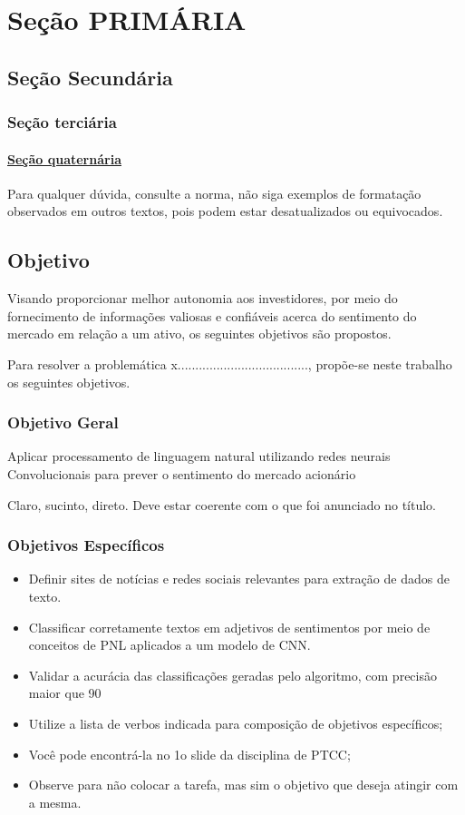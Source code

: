 {\color{red}
\chapter{Seção PRIMÁRIA}
\section{Seção Secundária}
\subsection{Seção terciária}
\subsubsection{\underline{Seção quaternária}}%

Para qualquer dúvida, consulte a norma, não siga exemplos de formatação observados em outros textos, pois podem estar desatualizados ou equivocados.
}

\section{Objetivo}
Visando proporcionar melhor autonomia aos investidores, por meio do fornecimento de informações valiosas e confiáveis acerca do sentimento do mercado em relação a um ativo, os seguintes objetivos são propostos.

{\color{red}
Para resolver a problemática x....................................., propõe-se neste trabalho os seguintes objetivos.
}

\subsection{Objetivo Geral}
Aplicar processamento de linguagem natural utilizando redes neurais Convolucionais para prever o sentimento do mercado acionário 

{\color{red}
Claro, sucinto, direto. Deve estar coerente com o que foi anunciado no título.
}

\subsection{Objetivos Específicos}
\begin{itemize}
    \item Definir sites de notícias e redes sociais relevantes para extração de dados de texto.
    \item Classificar corretamente textos em adjetivos de sentimentos por meio de conceitos de PNL aplicados a um modelo de CNN.
    \item Validar a acurácia das classificações geradas pelo algoritmo, com precisão maior que 90%
\end{itemize}

{\color{red}
\begin{itemize}
    \item Utilize a lista de verbos indicada para composição de objetivos específicos;
    \item Você pode encontrá-la no 1o slide da disciplina de PTCC;
    \item Observe para não colocar a tarefa, mas sim o objetivo que deseja atingir com a mesma.
\end{itemize}
}

